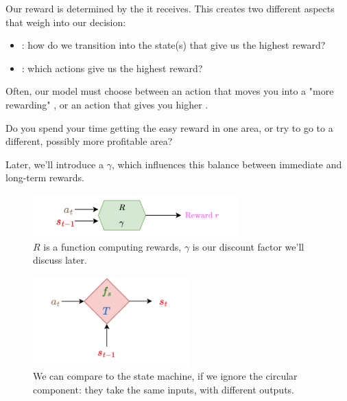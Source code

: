         \begin{concept}
            Our reward is determined by the  it receives. This creates two different aspects that weigh into our decision:

            \begin{itemize}
                \item {}: how do we transition into the state(s) that give us the highest reward?
                \item {}: which actions give us the highest reward?
            \end{itemize}

            Often, our model must choose between an action that moves you into a "more rewarding" , or an action that gives you higher .
        \end{concept}

        \miniex Do you spend your time getting the easy reward in one area, or try to go to a different, possibly more profitable area?

        Later, we'll introduce a  $\gamma$, which influences this balance between immediate and long-term rewards.

        \begin{figure}[H]
            \centering
            \includegraphics[width=80mm,scale=0.5]{images/mdp_images/reward_function.png}
            
            \caption*{$R$ is a function computing rewards, $\gamma$ is our discount factor we'll discuss later.}
        \end{figure}

        \begin{figure}[H]
            \centering
            \includegraphics[width=60mm,scale=0.5]{images/mdp_images/state_machine_noloop.png}
            
            \caption*{We can compare to the state machine, if we ignore the circular component: they take the same inputs, with different outputs.}
        \end{figure}

